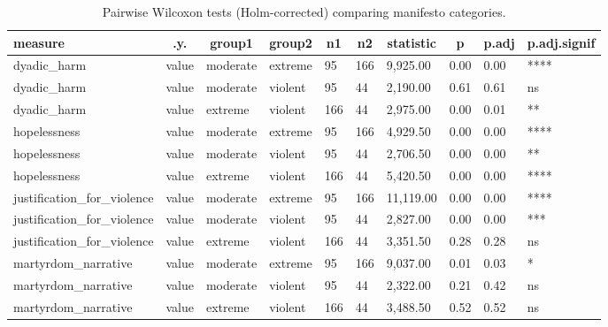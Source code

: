 \documentclass[
  english,
  man,floatsintext]{apa6}
\begin{document}
\begin{table}[tbp]

\begin{center}
\begin{threeparttable}

\caption{\label{tab:category-nonparametric-tests}Pairwise Wilcoxon tests (Holm-corrected) comparing manifesto categories.}

\begin{tabular}{llllllllll}
\toprule
measure & \multicolumn{1}{c}{.y.} & \multicolumn{1}{c}{group1} & \multicolumn{1}{c}{group2} & \multicolumn{1}{c}{n1} & \multicolumn{1}{c}{n2} & \multicolumn{1}{c}{statistic} & \multicolumn{1}{c}{p} & \multicolumn{1}{c}{p.adj} & \multicolumn{1}{c}{p.adj.signif}\\
\midrule
dyadic\_harm & value & moderate & extreme & 95 & 166 & 9,925.00 & 0.00 & 0.00 & ****\\
dyadic\_harm & value & moderate & violent & 95 & 44 & 2,190.00 & 0.61 & 0.61 & ns\\
dyadic\_harm & value & extreme & violent & 166 & 44 & 2,975.00 & 0.00 & 0.01 & **\\
hopelessness & value & moderate & extreme & 95 & 166 & 4,929.50 & 0.00 & 0.00 & ****\\
hopelessness & value & moderate & violent & 95 & 44 & 2,706.50 & 0.00 & 0.00 & **\\
hopelessness & value & extreme & violent & 166 & 44 & 5,420.50 & 0.00 & 0.00 & ****\\
justification\_for\_violence & value & moderate & extreme & 95 & 166 & 11,119.00 & 0.00 & 0.00 & ****\\
justification\_for\_violence & value & moderate & violent & 95 & 44 & 2,827.00 & 0.00 & 0.00 & ***\\
justification\_for\_violence & value & extreme & violent & 166 & 44 & 3,351.50 & 0.28 & 0.28 & ns\\
martyrdom\_narrative & value & moderate & extreme & 95 & 166 & 9,037.00 & 0.01 & 0.03 & *\\
martyrdom\_narrative & value & moderate & violent & 95 & 44 & 2,322.00 & 0.21 & 0.42 & ns\\
martyrdom\_narrative & value & extreme & violent & 166 & 44 & 3,488.50 & 0.52 & 0.52 & ns\\
\bottomrule
\end{tabular}

\end{threeparttable}
\end{center}

\end{table}
\end{document}
